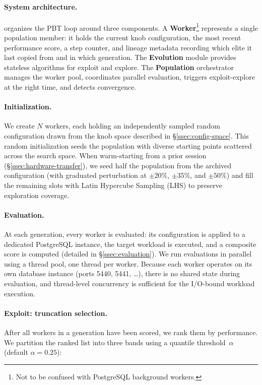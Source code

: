 \paragraph{System architecture.}
\sysname organizes the PBT loop around three components.  A
\textbf{Worker}\footnote{Not to be confused with PostgreSQL background
workers.} represents a single population member: it holds the current knob
configuration, the most recent performance score, a step counter, and lineage
metadata recording which elite it last copied from and in which generation.
The \textbf{Evolution} module provides stateless algorithms for exploit and
explore.  The \textbf{Population} orchestrator manages the worker pool,
coordinates parallel evaluation, triggers exploit-explore at the right time,
and detects convergence.

\paragraph{Initialization.}
We create $N$ workers, each holding an independently sampled random
configuration drawn from the knob space described in
\S\ref{ssec:config-space}.  This random initialization seeds the population
with diverse starting points scattered across the search space.  When
warm-starting from a prior session (\S\ref{ssec:hardware-transfer}), we seed
half the population from the archived configuration (with graduated
perturbation at $\pm 20\%$, $\pm 35\%$, and $\pm 50\%$) and fill the
remaining slots with Latin Hypercube Sampling (LHS) to preserve exploration
coverage.

\paragraph{Evaluation.}
At each generation, every worker is evaluated: its configuration is applied to
a dedicated PostgreSQL instance, the target workload is executed, and a
composite score is computed (detailed in \S\ref{ssec:evaluation}).  We run
evaluations in parallel using a thread pool, one thread per worker.  Because
each worker operates on its own database instance (ports 5440, 5441, \ldots),
there is no shared state during evaluation, and thread-level concurrency is
sufficient for the I/O-bound workload execution.

\paragraph{Exploit: truncation selection.}
After all workers in a generation have been scored, we rank them by
performance.  We partition the ranked list into three bands using a quantile
threshold~$\alpha$ (default $\alpha = 0.25$):

